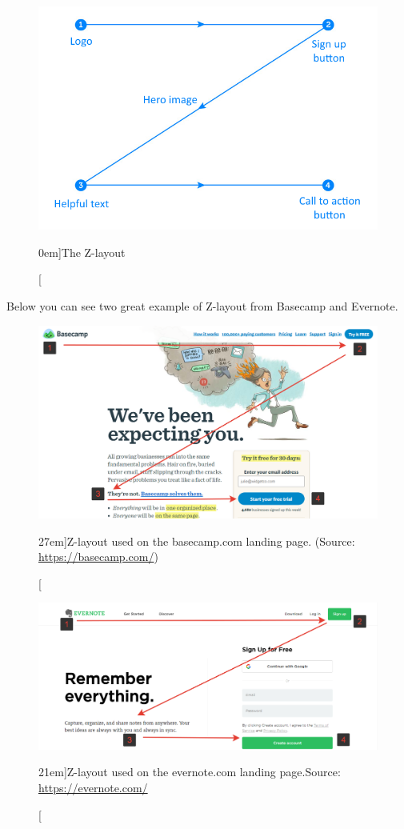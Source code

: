 \begin{figure}%
	\centering
  \includegraphics[width=1\textwidth]{../figures/z-shape.png}
  \caption[][0em]{The Z-layout}
  \label{fig:z-layout}
\end{figure}
	

Below you can see two great example of Z-layout from Basecamp and Evernote.
\begin{figure}%
	\centering
  \includegraphics[width=1.5\textwidth]{../figures/z-shape_basecamp.png}
  \caption[][27em]{Z-layout used on the basecamp.com landing page. (Source: \url{https://basecamp.com/})}
  \label{fig:z-shape_facebook}
\end{figure}

\begin{figure}%
	\centering
  \includegraphics[width=1.5\textwidth]{../figures/z-shape_evernote.png}
  \caption[][21em]{Z-layout used on the evernote.com landing page.\newline Source: \url{https://evernote.com/}}
  \label{fig:z-shape_facebook}
\end{figure}

